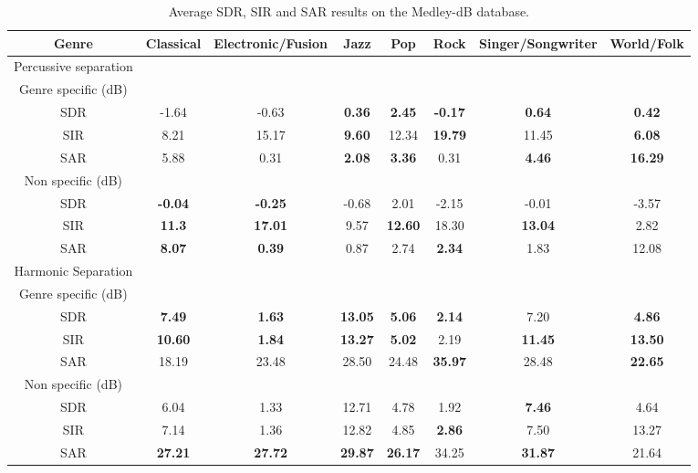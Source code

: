 \documentclass{article}
\begin{document}
\begin{table}
   
   \begin{tabular}{|c|c|c|c|c|c|c|c|}
\hline   
Genre & Classical & Electronic/Fusion & Jazz & Pop & Rock & Singer/Songwriter & World/Folk \\
\hline
Percussive separation & & & & & & & \\
\hline
Genre specific (dB)  & & & & & & & \\
SDR & -1.64     & -0.63     &\bf{0.36} & \bf{2.45}&\bf{-0.17}& \bf{0.64} & \bf{0.42} \\
SIR & 8.21      & 15.17     &\bf{9.60} & 12.34    &\bf{19.79}& 11.45     & \bf{6.08} \\
SAR & 5.88      & 0.31      &\bf{2.08} & \bf{3.36}& 0.31     & \bf{4.46} & \bf{16.29} \\
\hline
Non specific (dB) & & & & & & &\\
SDR & \bf{-0.04}& \bf{-0.25}& -0.68    & 2.01     & -2.15    & -0.01     & -3.57 \\
SIR & \bf{11.3} & \bf{17.01}& 9.57     &\bf{12.60}& 18.30    & \bf{13.04}& 2.82 \\
SAR & \bf{8.07} & \bf{0.39} & 0.87     & 2.74     &\bf{2.34} & 1.83      & 12.08 \\
\hline   
Harmonic Separation &  & & & & & & \\  
\hline
Genre specific (dB)  & & & & & & & \\
SDR & \bf{7.49}    & \bf{1.63}    & \bf{13.05} & \bf{5.06}  & \bf{2.14}& 7.20      &\bf{4.86} \\
SIR & \bf{10.60}   & \bf{1.84}    & \bf{13.27} & \bf{5.02 } & 2.19     & \bf{11.45}& \bf{13.50} \\
SAR & 18.19       & 23.48       & 28.50      & 24.48      &\bf{35.97}& 28.48     & \bf{22.65} \\
\hline
Non specific (dB) & & & & & & &\\
SDR & 6.04        & 1.33        & 12.71     & 4.78      & 1.92      & \bf{7.46}      & 4.64\\
SIR & 7.14        & 1.36        & 12.82     & 4.85      & \bf{2.86} & 7.50      & 13.27 \\
SAR & \bf{27.21}& \bf{27.72}   & \bf{29.87} & \bf{26.17}& 34.25     &\bf{31.87} & 21.64\\
\hline
  \end{tabular} 
\caption{\label{specresults} Average SDR, SIR and SAR results on the Medley-dB database.}
\end{table}
\end{document}
